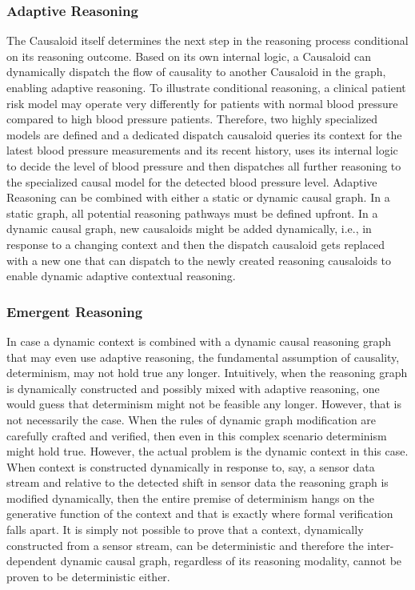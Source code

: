 \subsubsection{Adaptive Reasoning}


The Causaloid itself determines the next step in the reasoning process conditional on its reasoning outcome. Based on its own internal logic, a Causaloid can dynamically dispatch the flow of causality to another Causaloid in the graph, enabling adaptive reasoning. To illustrate conditional reasoning, a clinical patient risk model may operate very differently for patients with normal blood pressure compared to high blood pressure patients. Therefore, two highly specialized models are defined and a dedicated dispatch causaloid queries its context for the latest blood pressure measurements and its recent history, uses its internal logic to decide the level of blood pressure and then dispatches all further reasoning to the specialized causal model for the detected blood pressure level. Adaptive Reasoning can be combined with either a static or dynamic causal graph. In a static graph, all potential reasoning pathways must be defined upfront. In a dynamic causal graph, new causaloids might be added dynamically, i.e., in response to a changing context and then the dispatch causaloid gets replaced with a new one that can dispatch to the newly created reasoning causaloids to enable dynamic adaptive contextual reasoning.  

\subsubsection{Emergent Reasoning}

In case a dynamic context is combined with a dynamic causal reasoning graph that may even use adaptive reasoning, the fundamental assumption of causality, determinism, may not hold true any longer. Intuitively, when the reasoning graph is dynamically constructed and possibly mixed with adaptive reasoning, one would guess that determinism might not be feasible any longer. However, that is not necessarily the case. When the rules of dynamic graph modification are carefully crafted and verified, then even in this complex scenario determinism might hold true. However, the actual problem is the dynamic context in this case. When context is constructed dynamically in response to, say, a sensor data stream and relative to the detected shift in sensor data the reasoning graph is modified dynamically, then the entire premise of determinism hangs on the generative function of the context and that is exactly where formal verification falls apart. It is simply not possible to prove that a context, dynamically constructed from a sensor stream, can be deterministic and therefore the inter-dependent dynamic causal graph, regardless of its reasoning modality, cannot be proven to be deterministic either. 

